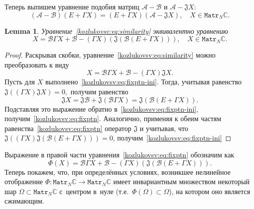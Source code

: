 \documentclass[a4paper]{article}
\newtheorem{lem}{Lemma}
\theoremstyle{definition}
\begin{document}
Теперь выпишем уравнение подобия матриц \( \mathcal{A} - \mathcal{B} \)
и \( \mathcal{A} - \mathfrak{J} X \):
\begin{equation}\label{kozlukovsv:eq:similarity}
    (\mathcal{A-B})(E+\Gamma X) = (E+\Gamma X)(\mathcal{A} - \mathfrak{J} X), \quad X\in\mathtt{Matr}_N\mathbb{C}.
\end{equation}
\begin{lem}
    Уравнение~\eqref{kozlukovsv:eq:similarity} эквивалентно уравнению
    \begin{equation}\label{kozlukovsv:eq:fixptn}
        X = \mathcal{B} \Gamma X + \mathcal{B} - (\Gamma X)(\mathfrak{J}(\mathcal{B} (E + \Gamma X))), \quad X\in\mathtt{Matr}_N\mathbb{C}.
    \end{equation}
\end{lem}
\begin{proof}
Раскрывая скобки, уравнение~\eqref{kozlukovsv:eq:similarity} можно преобразовать к виду
\begin{equation}\label{kozlukovsv:eq:fixptn-ini}
    X = \mathcal{B} \Gamma X + \mathcal{B} - (\Gamma X) \mathfrak{J} X.
\end{equation}
Пусть для \( X \) выполнено~\eqref{kozlukovsv:eq:fixptn-ini}.
Тогда, учитывая равенство \( \mathfrak{J}\left((\Gamma X)\mathfrak{J}X\right) = 0, \)
получим равенство
    \begin{equation}\label{kozlukovsv:eq:jx}
        \mathfrak{J} X = \mathfrak{J}\mathcal{B} + \mathfrak{J}\left(\mathcal{B}\Gamma X\right) = \mathfrak{J}(\mathcal{B} (E + \Gamma X)).
    \end{equation}
Подставляя это выражение обратно в~\eqref{kozlukovsv:eq:fixptn-ini},
    получим~\eqref{kozlukovsv:eq:fixptn}.
Аналогично, применяя к обеим частям равенства~\eqref{kozlukovsv:eq:fixptn} оператор \( \mathfrak{J} \)
    и учитывая, что \( \mathfrak{J}\left( (\Gamma X)\mathfrak{J}(\mathcal{B} (E + \Gamma X)) \right) = 0 \),
    получим~\eqref{kozlukovsv:eq:fixptn-ini}
\end{proof}

Выражение в правой части уравнения~\eqref{kozlukovsv:eq:fixptn} обозначим как
\[
    \Phi(X) = \mathcal{B} \Gamma X + \mathcal{B} - (\Gamma X)(\mathfrak{J}(\mathcal{B} (E + \Gamma X))).\]
Теперь покажем, что, при определ\"енных условиях,
возникшее нелинейное отображение \( \Phi:\mathtt{Matr}_N\mathbb{C}\to \mathtt{Matr}_N\mathbb{C} \) имеет инвариантным множеством
некоторый шар \( \Omega \subset \mathtt{Matr}_N\mathbb{C} \) с~центром в~нуле
(т.е.~\( \Phi(\Omega)\subset\Omega \)),
на котором оно является сжимающим.
\end{document}
